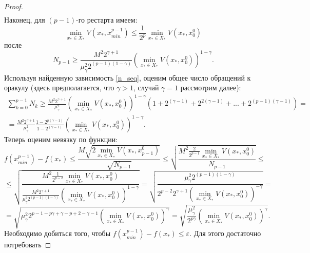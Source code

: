 \begin{proof}
$$\begin{aligned}
        \end{aligned}
        $$
        Наконец, для $(p-1)$-го рестарта имеем:
        \begin{equation} \label{v_seq}
            \min\limits_{x_* \in X_*}{V(x_*, x_{min}^{p - 1})} \leq \frac{1}{2^p} \min\limits_{x_* \in X_*}{V(x_*, x_0^0)}
        \end{equation}
        после
        \begin{equation} \label{n_seq}
            N_{p-1} \geq \frac{M^2 2^{\gamma + 1}}{\mu_{\gamma}^2 2^{(p - 1)(1 - \gamma)}} \left(\min\limits_{x_* \in X_*}{V(x_*, x_0^0)}\right)^{1 - \gamma}.
        \end{equation}
        Используя найденную зависимость \eqref{n_seq}, оценим общее число обращений к оракулу (здесь предполагается, что $\gamma > 1$, случай $\gamma = 1$ рассмотрим далее):
        \begin{equation} \label{n_p_sum}
        \begin{aligned}
            \sum_{k=0}^{p - 1} N_k \geq \frac{M^2 2^{\gamma + 1}}{\mu_{\gamma}^2} \left(\min\limits_{x_* \in X_*}{V(x_*, x_0^0)}\right)^{1 - \gamma} (1 + 2^{(\gamma-1)} + 2^{2(\gamma - 1)} + ... + 2^{(p-1)(\gamma - 1)}) = \\
            = \frac{M^2 2^{\gamma + 1}}{\mu_{\gamma}^2} \frac{1 - 2^{p(\gamma-1)}}{1 - 2^{(\gamma-1)}} \left(\min\limits_{x_* \in X_*}{V(x_*, x_0^0)}\right)^{1 - \gamma}.
        \end{aligned}
        \end{equation}
        Теперь оценим невязку по функции:
        $$
            f(x_{min}^{p-1}) - f(x_*) \leq \frac{M\sqrt{2\min\limits_{x_* \in X_*}{V(x_*, x_{p-1}^0)}}}{\sqrt{N_{p-1}}} \leq \sqrt{\frac{M^2 \frac{2}{2^{p-1}} \min\limits_{x_* \in X_*}{V(x_*, x_0^0)}}{N_{p-1}}} \leq
        $$
        $$
            \leq \sqrt{\frac{M^2 \frac{1}{2^{p-2}} \min\limits_{x_* \in X_*}{V(x_*, x_0^0)}}{\frac{M^2 2^{\gamma + 1}}{\mu_{\gamma}^2 2^{(p - 1)(1 - \gamma)}} \left(\min\limits_{x_* \in X_*}{V(x_*, x_0^0)}\right)^{1 - \gamma}}} = \sqrt{\frac{ \mu_{\gamma}^2 2^{(p - 1)(1 - \gamma)} }{2^{p-2} 2^{\gamma + 1} \left(\min\limits_{x_* \in X_*}{V(x_*, x_0^0)}\right)^{- \gamma}}} = 
        $$
        $$
            = \sqrt{\mu_{\gamma}^2 2^{p - 1 - p\gamma + \gamma - p + 2 - \gamma - 1} \left(\min\limits_{x_* \in X_*}{V(x_*, x_0^0)}\right)^{\gamma}} = \sqrt{\frac{\mu_{\gamma}^2} {2^{p\gamma}} \left(\min\limits_{x_* \in X_*}{V(x_*, x_0^0)}\right)^{\gamma}}.
        $$
        Необходимо добиться того, чтобы $f(x_{min}^{p-1}) - f(x_*) \leq \varepsilon$. Для этого достаточно потребовать

\end{proof}
